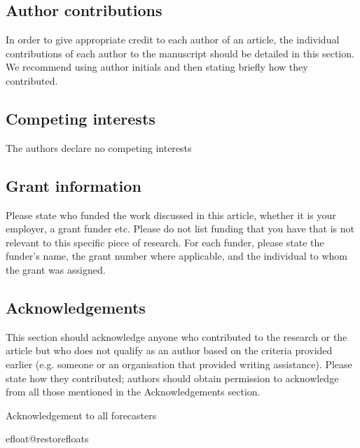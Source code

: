 \documentclass[10pt,a4paper,twocolumn]{article}
\begin{document}
\subsection*{Author contributions}
In order to give appropriate credit to each author of an article, the individual
contributions of each author to the manuscript should be detailed in this section. We
recommend using author initials and then stating briefly how they contributed.

\subsection*{Competing interests}
The authors declare no competing interests

\subsection*{Grant information}
Please state who funded the work discussed in this article, whether it is your employer,
a grant funder etc. Please do not list funding that you have that is not relevant to this
specific piece of research. For each funder, please state the funder’s name, the grant
number where applicable, and the individual to whom the grant was assigned.

\subsection*{Acknowledgements}
This section should acknowledge anyone who contributed to the research or the
article but who does not qualify as an author based on the criteria provided earlier
(e.g. someone or an organisation that provided writing assistance). Please state how
they contributed; authors should obtain permission to acknowledge from all those
mentioned in the Acknowledgements section.

Acknowledgement to all forecasters








\clearpage

{\small
}

\bigskip
\clearpage


\processdelayedfloats
\csname efloat@restorefloats\endcsname
\end{document}
